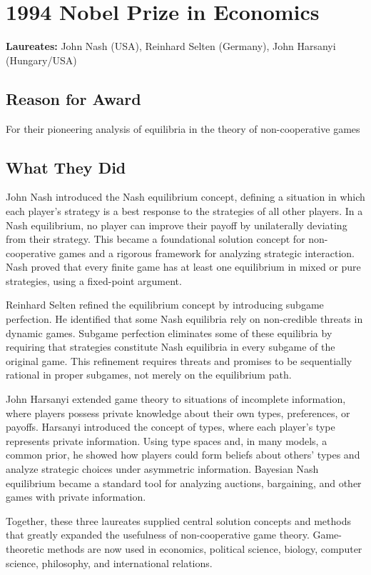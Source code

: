 \chapter{1994 Nobel Prize in Economics}
\textbf{Laureates: }John Nash (USA), Reinhard Selten (Germany), John Harsanyi (Hungary/USA)

\section*{Reason for Award}
For their pioneering analysis of equilibria in the theory of non-cooperative games

\section{What They Did}
John Nash introduced the Nash equilibrium concept, defining a situation in which
each player's strategy is a best response to the strategies of all other players.
In a Nash equilibrium, no player can improve their payoff by unilaterally
deviating from their strategy. This became a foundational solution concept for
non-cooperative games and a rigorous framework for analyzing strategic
interaction. Nash proved that every finite game has at least one equilibrium in
mixed or pure strategies, using a fixed-point argument.

Reinhard Selten refined the equilibrium concept by introducing subgame
perfection. He identified that some Nash equilibria rely on non-credible threats
in dynamic games. Subgame perfection eliminates some of these equilibria by
requiring that strategies constitute Nash equilibria in every subgame of the
original game. This refinement requires threats and promises to be sequentially
rational in proper subgames, not merely on the equilibrium path.

John Harsanyi extended game theory to situations of incomplete information,
where players possess private knowledge about their own types, preferences, or
payoffs. Harsanyi introduced the concept of types, where each player's type
represents private information. Using type spaces and, in many models, a common
prior, he showed how players could form beliefs about others' types and analyze
strategic choices under asymmetric information. Bayesian Nash equilibrium
became a standard tool for analyzing auctions, bargaining, and other games with
private information.

Together, these three laureates supplied central solution concepts and methods
that greatly expanded the usefulness of non-cooperative game theory. Game-
theoretic methods are now used in economics, political science, biology,
computer science, philosophy, and international relations.

